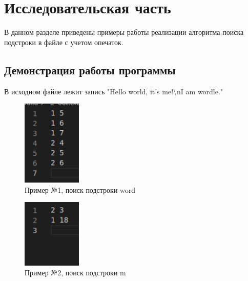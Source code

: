 \chapter{Исследовательская часть}

В данном разделе приведены примеры работы реализации алгоритма поиска подстроки в файле с учетом опечаток.

\section{Демонстрация работы программы}

В исходном файле лежит запись "Hello world, it's me!\textbackslash nI am wordle."

\begin{figure}[h]
	\centering
	\includegraphics[width=0.25\textwidth]{img/res_word.png}
	\caption{Пример №1, поиск подстроки word}
	\label{fig:test-01}
\end{figure}

\begin{figure}[h]
	\centering
	\includegraphics[width=0.25\textwidth]{img/res_m.png}
	\caption{Пример №2, поиск подстроки m}
	\label{fig:test-02}
\end{figure}
